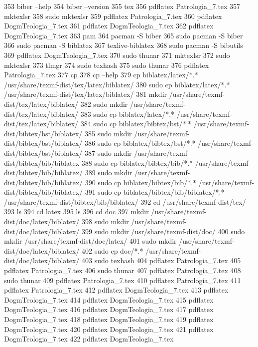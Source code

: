   353  biber --help
  354  biber --version
  355  tex
  356  pdflatex Patrologia_7.tex 
  357  mktexlsr
  358  sudo mktexlsr
  359  pdflatex Patrologia_7.tex 
  360  pdflatex DogmTeologia_7.tex 
  361  pdflatex DogmTeologia_7.tex 
  362  pdflatex DogmTeologia_7.tex 
  363  pam
  364  pacman -S biber
  365  sudo pacman -S biber
  366  sudo pacman -S biblatex
  367  texlive-biblatex
  368  sudo pacman -S bibutils
  369  pdflatex DogmTeologia_7.tex 
  370  sudo thunar
  371  mktexlsr
  372  sudo mktexlsr
  373  tlmgr
  374  sudo texhash
  375  sudo thunar
  376  pdflatex Patrologia_7.tex 
  377  cp
  378  cp --help
  379  cp biblatex/latex/*.* /usr/share/texmf-dist/tex/latex/biblatex/
  380  sudo cp biblatex/latex/*.* /usr/share/texmf-dist/tex/latex/biblatex/
  381  mkdir /usr/share/texmf-dist/tex/latex/biblatex/
  382  sudo mkdir /usr/share/texmf-dist/tex/latex/biblatex/
  383  sudo cp biblatex/latex/*.* /usr/share/texmf-dist/tex/latex/biblatex/
  384  sudo cp biblatex/bibtex/bst/*.* /usr/share/texmf-dist/bibtex/bst/biblatex/
  385  sudo mkdir /usr/share/texmf-dist/bibtex/bst/biblatex/
  386  sudo cp biblatex/bibtex/bst/*.* /usr/share/texmf-dist/bibtex/bst/biblatex/
  387  sudo mkdir /usr/share/texmf-dist/bibtex/bib/biblatex
  388  sudo cp biblatex/bibtex/bib/*.* /usr/share/texmf-dist/bibtex/bib/biblatex/
  389  sudo mkdir /usr/share/texmf-dist/bibtex/bib/biblatex/
  390  sudo cp biblatex/bibtex/bib/*.* /usr/share/texmf-dist/bibtex/bib/biblatex/
  391  sudo cp biblatex/bibtex/bib/biblatex/*.* /usr/share/texmf-dist/bibtex/bib/biblatex/
  392  cd /usr/share/texmf-dist/tex/
  393  ls
  394  cd latex
  395  ls
  396  cd doc
  397  mkdir /usr/share/texmf-dist/doc/latex/biblatex/
  398  sudo mkdir /usr/share/texmf-dist/doc/latex/biblatex/
  399  sudo mkdir /usr/share/texmf-dist/doc/
  400  sudo mkdir /usr/share/texmf-dist/doc/latex/
  401  sudo mkdir /usr/share/texmf-dist/doc/latex/biblatex/
  402  sudo cp doc/*.* /usr/share/texmf-dist/doc/latex/biblatex/
  403  sudo texhash
  404  pdflatex Patrologia_7.tex 
  405  pdflatex Patrologia_7.tex 
  406  sudo thunar
  407  pdflatex Patrologia_7.tex 
  408  sudo thunar
  409  pdflatex Patrologia_7.tex 
  410  pdflatex Patrologia_7.tex 
  411  pdflatex Patrologia_7.tex 
  412  pdflatex DogmTeologia_7.tex
  413  pdflatex DogmTeologia_7.tex
  414  pdflatex DogmTeologia_7.tex
  415  pdflatex DogmTeologia_7.tex
  416  pdflatex DogmTeologia_7.tex
  417  pdflatex DogmTeologia_7.tex
  418  pdflatex DogmTeologia_7.tex
  419  pdflatex DogmTeologia_7.tex
  420  pdflatex DogmTeologia_7.tex
  421  pdflatex DogmTeologia_7.tex
  422  pdflatex DogmTeologia_7.tex
